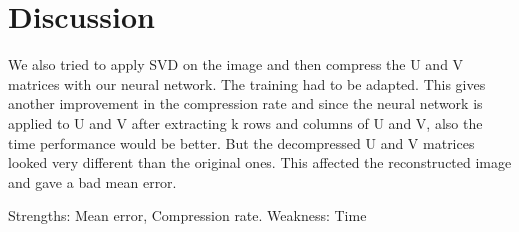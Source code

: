 \section{Discussion}

We also tried to apply SVD on the image and then compress the U and V matrices with our neural network. The training had to be adapted. This gives another improvement in the compression rate and since the neural network is applied to U and V after extracting k rows and columns of U and V, also the time performance would be better. But the decompressed U and V matrices looked very different than the original ones. This affected the reconstructed image and gave a bad mean error.\newline

Strengths: Mean error, Compression rate. \newline
Weakness: Time
